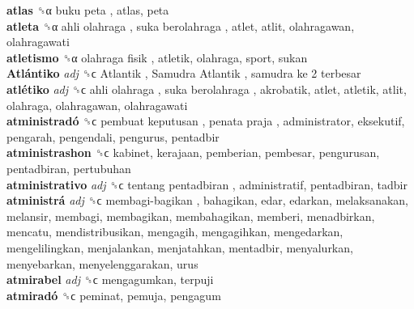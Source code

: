 \textbf{atlas} ␝α   buku peta , atlas, peta  \\
\textbf{atleta} ␝α   ahli olahraga ,  suka berolahraga , atlet, atlit, olahragawan, olahragawati  \\
\textbf{atletismo} ␝α   olahraga fisik , atletik, olahraga, sport, sukan  \\
\textbf{Atlántiko} \emph{adj}  ␝ϲ   Atlantik ,  Samudra Atlantik ,  samudra ke 2 terbesar   \\
\textbf{atlétiko} \emph{adj}  ␝ϲ   ahli olahraga ,  suka berolahraga , akrobatik, atlet, atletik, atlit, olahraga, olahragawan, olahragawati  \\
\textbf{atministradó} ␝ϲ   pembuat keputusan ,  penata praja , administrator, eksekutif, pengarah, pengendali, pengurus, pentadbir  \\
\textbf{atministrashon} ␝ϲ  kabinet, kerajaan, pemberian, pembesar, pengurusan, pentadbiran, pertubuhan  \\
\textbf{atministrativo} \emph{adj}  ␝ϲ   tentang pentadbiran , administratif, pentadbiran, tadbir  \\
\textbf{atministrá} \emph{adj}  ␝ϲ   membagi-bagikan , bahagikan, edar, edarkan, melaksanakan, melansir, membagi, membagikan, membahagikan, memberi, menadbirkan, mencatu, mendistribusikan, mengagih, mengagihkan, mengedarkan, mengelilingkan, menjalankan, menjatahkan, mentadbir, menyalurkan, menyebarkan, menyelenggarakan, urus  \\
\textbf{atmirabel} \emph{adj}  ␝ϲ  mengagumkan, terpuji  \\
\textbf{atmiradó} ␝ϲ  peminat, pemuja, pengagum  \\
